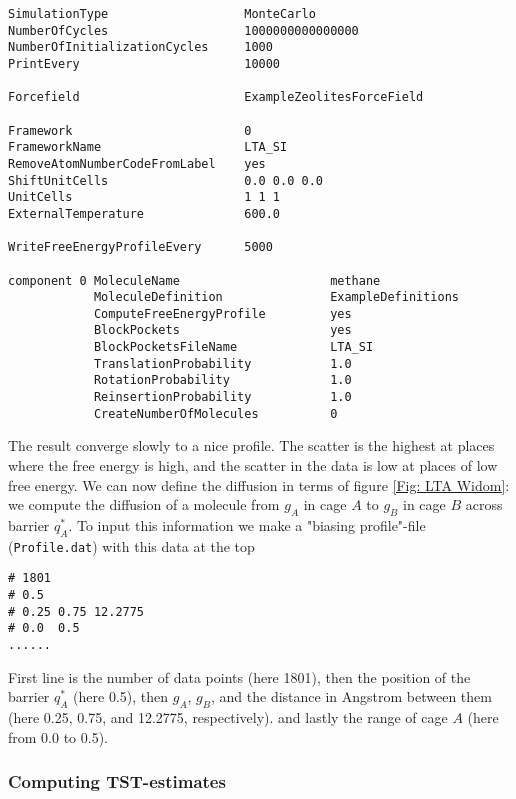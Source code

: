 \begin{tiny}
\begin{verbatim}
SimulationType                   MonteCarlo
NumberOfCycles                   1000000000000000
NumberOfInitializationCycles     1000
PrintEvery                       10000

Forcefield                       ExampleZeolitesForceField

Framework                        0
FrameworkName                    LTA_SI
RemoveAtomNumberCodeFromLabel    yes
ShiftUnitCells                   0.0 0.0 0.0
UnitCells                        1 1 1
ExternalTemperature              600.0

WriteFreeEnergyProfileEvery      5000

component 0 MoleculeName                     methane
            MoleculeDefinition               ExampleDefinitions
            ComputeFreeEnergyProfile         yes
            BlockPockets                     yes
            BlockPocketsFileName             LTA_SI
            TranslationProbability           1.0
            RotationProbability              1.0
            ReinsertionProbability           1.0
            CreateNumberOfMolecules          0
\end{verbatim}
\end{tiny}

The result converge slowly to a nice profile. The scatter is the highest at places where the free energy is high, and
the scatter in the data is low at places of low free energy. We can now define the diffusion in terms of
figure \ref{Fig: LTA Widom}: we compute the diffusion of a molecule from $g_A$ in cage $A$ to $g_B$ in cage $B$
across barrier $q_A^*$.
To input this information we make a "biasing profile"-file (\verb+Profile.dat+) with this data at the top
\begin{small}
\begin{verbatim}
# 1801
# 0.5
# 0.25 0.75 12.2775
# 0.0  0.5
......
\end{verbatim}
\end{small}
First line is the number of data points (here 1801), then the position of the barrier $q_A^*$ (here 0.5),
then $g_A$, $g_B$, and the distance in Angstrom between them (here 0.25, 0.75, and 12.2775, respectively).
and lastly the range of cage $A$ (here from 0.0 to 0.5).

\subsubsection{Computing TST-estimates}

